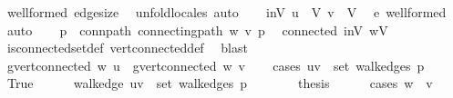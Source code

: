 \begin{isabellebody}
\ wellformed\ edge{\isacharunderscore}{\kern0pt}size\ \isamarkupfalse%
\ {\isacharparenleft}{\kern0pt}unfold{\isacharunderscore}{\kern0pt}locales{\isacharcomma}{\kern0pt}\ auto{\isacharparenright}{\kern0pt}\isanewline
\ \ \isamarkupfalse%
\ inV{\isacharcolon}{\kern0pt}\ {\isachardoublequoteopen}u\ {\isasymin}\ V{\isachardoublequoteclose}\ {\isachardoublequoteopen}v\ {\isasymin}\ V{\isachardoublequoteclose}\ \isamarkupfalse%
\ e\ wellformed\ \isamarkupfalse%
\ auto\isanewline
\ \ \isamarkupfalse%
\ p\ \ conn{\isacharunderscore}{\kern0pt}path{\isacharcolon}{\kern0pt}\ {\isachardoublequoteopen}connecting{\isacharunderscore}{\kern0pt}path\ w\ v\ p{\isachardoublequoteclose}\ \isamarkupfalse%
\ connected\ inV\ {\isacartoucheopen}w{\isasymin}V{\isacartoucheclose}\ \isamarkupfalse%
\ is{\isacharunderscore}{\kern0pt}connected{\isacharunderscore}{\kern0pt}set{\isacharunderscore}{\kern0pt}def\ vert{\isacharunderscore}{\kern0pt}connected{\isacharunderscore}{\kern0pt}def\ \isamarkupfalse%
\ blast\isanewline
\ \ \isamarkupfalse%
\ \isamarkupfalse%
\ {\isachardoublequoteopen}g{\isacharprime}{\kern0pt}{\isachardot}{\kern0pt}vert{\isacharunderscore}{\kern0pt}connected\ w\ u\ {\isasymor}\ g{\isacharprime}{\kern0pt}{\isachardot}{\kern0pt}vert{\isacharunderscore}{\kern0pt}connected\ w\ v{\isachardoublequoteclose}\isanewline
\ \ \isamarkupfalse%
\ {\isacharparenleft}{\kern0pt}cases\ {\isachardoublequoteopen}{\isacharbraceleft}{\kern0pt}u{\isacharcomma}{\kern0pt}v{\isacharbraceright}{\kern0pt}\ {\isasymin}\ set\ {\isacharparenleft}{\kern0pt}walk{\isacharunderscore}{\kern0pt}edges\ p{\isacharparenright}{\kern0pt}{\isachardoublequoteclose}{\isacharparenright}{\kern0pt}\isanewline
\ \ \ \ \isamarkupfalse%
\ True\isanewline
\ \ \ \ \isamarkupfalse%
\ walk{\isacharunderscore}{\kern0pt}edge{\isacharcolon}{\kern0pt}\ {\isachardoublequoteopen}{\isacharbraceleft}{\kern0pt}u{\isacharcomma}{\kern0pt}v{\isacharbraceright}{\kern0pt}\ {\isasymin}\ set\ {\isacharparenleft}{\kern0pt}walk{\isacharunderscore}{\kern0pt}edges\ p{\isacharparenright}{\kern0pt}{\isachardoublequoteclose}\isanewline
\ \ \ \ \isamarkupfalse%
\ \isamarkupfalse%
\ {\isacharquery}{\kern0pt}thesis\isanewline
\ \ \ \ \isamarkupfalse%
\ {\isacharparenleft}{\kern0pt}cases\ {\isachardoublequoteopen}w\ {\isacharequal}{\kern0pt}\ v{\isachardoublequoteclose}{\isacharparenright}{\kern0pt}\isanewline

\end{isabellebody}
